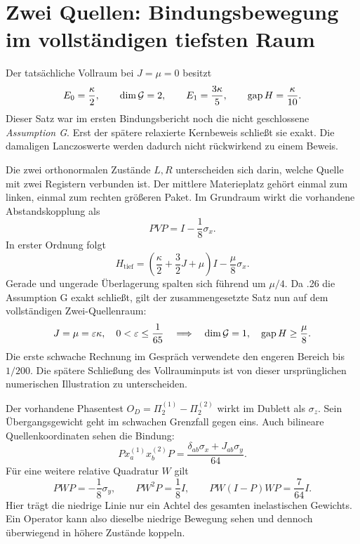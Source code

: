 \section{Zwei Quellen: Bindungsbewegung im vollständigen tiefsten Raum}
Der tatsächliche Vollraum bei $J=\mu=0$ besitzt
\[
 E_0=\frac\kappa2,\qquad\dim\mathcal G=2,\qquad
 E_1=\frac{3\kappa}5,\qquad\operatorname{gap} H=\frac\kappa{10}.
\]
Dieser Satz war im ersten Bindungsbericht noch die nicht geschlossene \emph{Assumption G}. Erst der spätere relaxierte Kernbeweis schließt sie exakt. Die damaligen Lanczoswerte werden dadurch nicht rückwirkend zu einem Beweis. 

Die zwei orthonormalen Zustände $L,R$ unterscheiden sich darin, welche Quelle mit zwei Registern verbunden ist. Der mittlere Materieplatz gehört einmal zum linken, einmal zum rechten größeren Paket. Im Grundraum wirkt die vorhandene Abstandskopplung als
\[
 PVP=I-\frac18\sigma_x.
\]
In erster Ordnung folgt
\[
 H_{\mathrm{tief}}=
 \left(\frac\kappa2+\frac32J+\mu\right)I-\frac\mu8\sigma_x.
\]
Gerade und ungerade Überlagerung spalten sich führend um $\mu/4$. Da .26 die Assumption G exakt schließt, gilt der zusammengesetzte Satz nun auf dem vollständigen Zwei-Quellenraum:
\[
 J=\mu=\varepsilon\kappa,\quad0<\varepsilon\le\frac1{65}
 \quad\Longrightarrow\quad\dim\mathcal G=1,\quad\operatorname{gap} H\ge\frac\mu8.
\]
Die erste schwache Rechnung im Gespräch verwendete den engeren Bereich bis $1/200$. Die spätere Schließung des Vollrauminputs ist von dieser ursprünglichen numerischen Illustration zu unterscheiden. 


Der vorhandene Phasentest $O_D=\Pi_2^{(1)}-\Pi_2^{(2)}$ wirkt im Dublett als $\sigma_z$. Sein Übergangsgewicht geht im schwachen Grenzfall gegen eins. Auch bilineare Quellenkoordinaten sehen die Bindung:
\[
 P x_a^{(1)}x_b^{(2)}P
 =\frac{\delta_{ab}\sigma_x+J_{ab}\sigma_y}{64}.
\]
Für eine weitere relative Quadratur $W$ gilt
\[
 PWP=-\frac18\sigma_y,\qquad PW^2P=\frac18I,\qquad
 PW(I-P)WP=\frac7{64}I.
\]
Hier trägt die niedrige Linie nur ein Achtel des gesamten inelastischen Gewichts. Ein Operator kann also dieselbe niedrige Bewegung sehen und dennoch überwiegend in höhere Zustände koppeln. 

